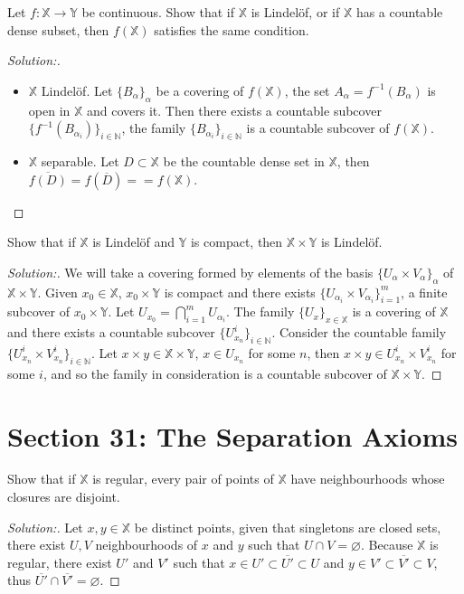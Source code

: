 \documentclass[a4paper,12pt, reqno]{article}
\theoremstyle{definition}
\newenvironment{exerr}[1]{
  \renewcommand\theexeralt{#1}
  \exeralt
}{\endexeralt}
\newenvironment{solution}{\begin{proof}[Solution:]}{\end{proof}}
\newcommand{\N}{\mathbb{N}}
\newcommand{\X}{\mathbb{X}}
\newcommand{\Y}{\mathbb{Y}}
\begin{document}
\begin{exerr}{11}
  Let $f:\X\to\Y$ be continuous. Show that if $\X$ is Lindelöf, or if $\X$ has a countable dense subset, then $f(\X)$ satisfies the same condition.
\end{exerr}
\begin{solution}\hfill
  \begin{itemize}
    \item $\X$ Lindelöf. Let $\{ B_{\alpha} \}_{\alpha}$ be a covering of $f(\X)$, the set $A_{\alpha} = f^{-1}(B_{\alpha})$ is open in $\X$ and covers it. Then there exists a countable subcover $\{ f^{-1}(B_{\alpha_{i}}) \}_{i\in\N}$, the family $\{ B_{\alpha_{i}} \}_{i\in\N}$ is a countable subcover of $f(\X)$.
    \item $\X$ separable. Let $D\subset\X$ be the countable dense set in $\X$, then $\overline{f(D)} = f(\overline{D}) = = f(\X)$.
  \end{itemize}
\end{solution}

\begin{exerr}{14}
  Show that if $\X$ is Lindelöf and $\Y$ is compact, then $\X\times\Y$ is Lindelöf.
\end{exerr}
\begin{solution}
  We will take a covering formed by elements of the basis $\{ U_{\alpha}\times V_{\alpha} \}_{\alpha}$ of $\X\times\Y$. Given $x_{0}\in\X$, $x_{0}\times\Y$ is compact and there exists $\{ U_{\alpha_{i}}\times V_{\alpha_{i}} \}_{i=1}^m$, a finite subcover of $x_{0}\times\Y$. Let $U_{x_{0}} = \bigcap_{i=1}^m U_{\alpha_{i}}$. The family $\{ U_{x} \}_{x\in\X}$ is a covering of $\X$ and there exists a countable subcover $\{ U_{x_{n}}^i \}_{i\in\N}$. Consider the countable family $\{ U_{x_{n}}^i\times V_{x_{n}}^i \}_{i\in\N}$. Let $x\times y\in\X\times\Y$, $x\in U_{x_n}$ for some $n$, then $x\times y\in U_{x_{n}}^i\times V_{x_{n}}^i$ for some $i$, and so the family in consideration is a countable subcover of $\X\times\Y$.
\end{solution}

\section*{Section 31: The Separation Axioms}

\begin{exerr}{1}
  Show that if $\X$ is regular, every pair of points of $\X$ have neighbourhoods whose closures are disjoint.
\end{exerr}
\begin{solution}
  Let $x,y\in\X$ be distinct points, given that singletons are closed sets, there exist $U,V$ neighbourhoods of $x$ and $y$ such that $U\cap V = \varnothing$. Because $\X$ is regular, there exist $U'$ and $V'$ such that $x\in U'\subset \overline{U'}\subset U$ and $y\in V'\subset \overline{V'}\subset V$, thus $\overline{U'}\cap\overline{V'} = \varnothing$.
\end{solution}
\end{document}
